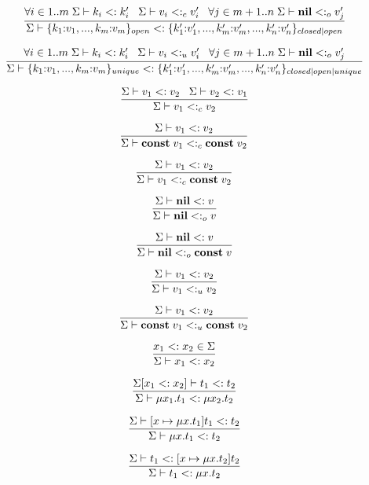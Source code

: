 \[
\dfrac{\forall i \in 1..m \; \Sigma \vdash k_{i} <: k_{i}' \;\;\;
       \Sigma \vdash v_{i} <:_{c} v_{i}' \;\;\;
       \forall j \in m+1..n \; \Sigma \vdash \mathbf{nil} <:_{o} v_{j}'}
      {\Sigma \vdash \{k_{1}{:}v_{1}, ..., k_{m}{:}v_{m}\}_{open} <:
                    \{k_{1}'{:}v_{1}', ..., k_{m}'{:}v_{m}', ..., k_{n}'{:}v_{n}'\}_{closed|open}}
\]

\[
\dfrac{\forall i \in 1..m \; \Sigma \vdash k_{i} <: k_{i}' \;\;\;
       \Sigma \vdash v_{i} <:_{u} v_{i}' \;\;\;
       \forall j \in m+1..n \; \Sigma \vdash \mathbf{nil} <:_{o} v_{j}'}
      {\Sigma \vdash \{k_{1}{:}v_{1}, ..., k_{m}{:}v_{m}\}_{unique} <:
                    \{k_{1}'{:}v_{1}', ..., k_{m}'{:}v_{m}', ..., k_{n}'{:}v_{n}'\}_{closed|open|unique}}
\]

\[
\dfrac{\Sigma \vdash v_{1} <: v_{2} \;\;\;
       \Sigma \vdash v_{2} <: v_{1}}
      {\Sigma \vdash v_{1} <:_{c} v_{2}}
\]

\[
\dfrac{\Sigma \vdash v_{1} <: v_{2}}
      {\Sigma \vdash \mathbf{const} \; v_{1} <:_{c} \mathbf{const} \; v_{2}}
\]

\[
\dfrac{\Sigma \vdash v_{1} <: v_{2}}
      {\Sigma \vdash v_{1} <:_{c} \mathbf{const} \; v_{2}}
\]

\[
\dfrac{\Sigma \vdash \mathbf{nil} <: v}
      {\Sigma \vdash \mathbf{nil} <:_{o} v}
\]

\[
\dfrac{\Sigma \vdash \mathbf{nil} <: v}
      {\Sigma \vdash \mathbf{nil} <:_{o} \mathbf{const} \; v}
\]

\[
\dfrac{\Sigma \vdash v_{1} <: v_{2}}
      {\Sigma \vdash v_{1} <:_{u} v_{2}}
\]

\[
\dfrac{\Sigma \vdash v_{1} <: v_{2}}
      {\Sigma \vdash \mathbf{const} \; v_{1} <:_{u} \mathbf{const} \; v_{2}}
\]

\[
\dfrac{x_{1} <: x_{2} \in \Sigma}
      {\Sigma \vdash x_{1} <: x_{2}}
\]

\[
\dfrac{\Sigma[x_{1} <: x_{2}] \vdash t_{1} <: t_{2}}
      {\Sigma \vdash \mu x_{1}.t_{1} <: \mu x_{2}.t_{2}}
\]

\[
\dfrac{\Sigma \vdash [x \mapsto \mu x.t_{1}]t_{1} <: t_{2}}
      {\Sigma \vdash \mu x.t_{1} <: t_{2}}
\]

\[
\dfrac{\Sigma \vdash t_{1} <: [x \mapsto \mu x.t_{2}]t_{2}}
      {\Sigma \vdash t_{1} <: \mu x.t_{2}}
\]

